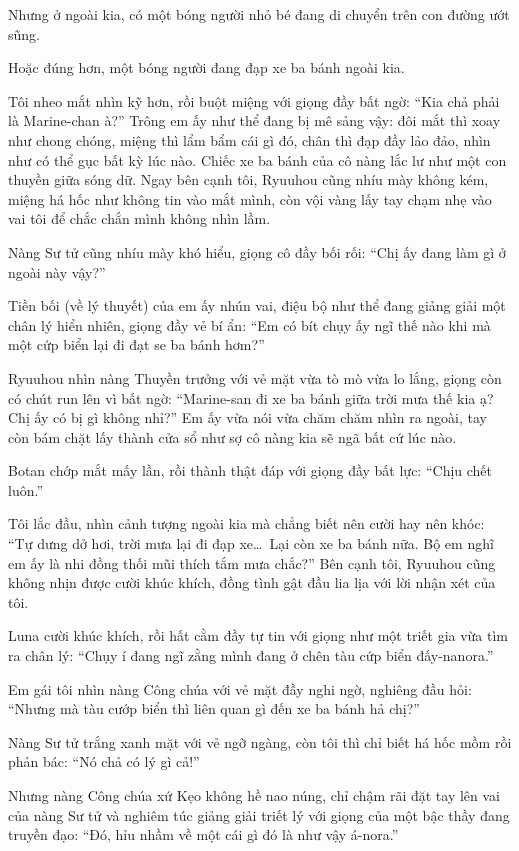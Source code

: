 \documentclass[../main.tex]{subfiles}
\begin{document}
Nhưng ở ngoài kia, có một bóng người nhỏ bé đang di chuyển trên con đường ướt sũng.

Hoặc đúng hơn, một bóng người đang đạp xe ba bánh ngoài kia.

Tôi nheo mắt nhìn kỹ hơn, rồi buột miệng với giọng đầy bất ngờ: ``Kia chả phải là Marine-chan à?'' Trông em ấy như thể đang bị mê sảng vậy: đôi mắt thì xoay như chong chóng, miệng thì lẩm bẩm cái gì đó, chân thì đạp đầy lảo đảo, nhìn như có thể gục bất kỳ lúc nào. Chiếc xe ba bánh của cô nàng lắc lư như một con thuyền giữa sóng dữ. Ngay bên cạnh tôi, Ryuuhou cũng nhíu mày không kém, miệng há hốc như không tin vào mắt mình, còn vội vàng lấy tay chạm nhẹ vào vai tôi để chắc chắn mình không nhìn lầm.


Nàng Sư tử cũng nhíu mày khó hiểu, giọng cô đầy bối rối: ``Chị ấy đang làm gì ở ngoài này vậy?''

Tiền bối (về lý thuyết) của em ấy nhún vai, điệu bộ như thể đang giảng giải một chân lý hiển nhiên, giọng đầy vẻ bí ẩn: ``Em có bít chụy ấy ngĩ thế nào khi mà một cứp biển lại đi đạt se ba bánh hơm?''

Ryuuhou nhìn nàng Thuyền trưởng với vẻ mặt vừa tò mò vừa lo lắng, giọng còn có chút run lên vì bất ngờ: ``Marine-san đi xe ba bánh giữa trời mưa thế kia ạ? Chị ấy có bị gì không nhỉ?'' Em ấy vừa nói vừa chăm chăm nhìn ra ngoài, tay còn bám chặt lấy thành cửa sổ như sợ cô nàng kia sẽ ngã bất cứ lúc nào.

Botan chớp mắt mấy lần, rồi thành thật đáp với giọng đầy bất lực: ``Chịu chết luôn.''

Tôi lắc đầu, nhìn cảnh tượng ngoài kia mà chẳng biết nên cười hay nên khóc: ``Tự dưng dở hơi, trời mưa lại đi đạp xe\dots\ Lại còn xe ba bánh nữa. Bộ em nghĩ em ấy là nhi đồng thối mũi thích tắm mưa chắc?'' Bên cạnh tôi, Ryuuhou cũng không nhịn được cười khúc khích, đồng tình gật đầu lia lịa với lời nhận xét của tôi.

Luna cười khúc khích, rồi hất cằm đầy tự tin với giọng như một triết gia vừa tìm ra chân lý: ``Chụy í đang ngĩ zằng mình đang ở chên tàu cứp biển đấy-nanora.''

Em gái tôi nhìn nàng Công chúa với vẻ mặt đầy nghi ngờ, nghiêng đầu hỏi: ``Nhưng mà tàu cướp biển thì liên quan gì đến xe ba bánh hả chị?''

Nàng Sư tử trắng xanh mặt với vẻ ngỡ ngàng, còn tôi thì chỉ biết há hốc mồm rồi phản bác: ``Nó chả có lý gì cả!''

Nhưng nàng Công chúa xứ Kẹo không hề nao núng, chỉ chậm rãi đặt tay lên vai của nàng Sư tử và nghiêm túc giảng giải triết lý với giọng của một bậc thầy đang truyền đạo: ``Đó, hỉu nhầm về một cái gì đó là như vậy á-nora.''
\end{document}
